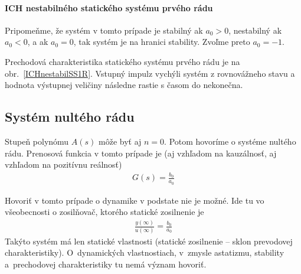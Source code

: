 \documentclass[a4paper, 10pt, ]{article}
\begin{document}
\paragraph{ICH nestabilného statického systému prvého rádu}

Pripomeňme, že  systém v tomto prípade je stabilný ak $a_0 > 0$, nestabilný ak $a_0 < 0$, a ak $a_0 = 0$, tak systém je na hranici stability. Zvoľme preto $a_0 = -1$.

Prechodová charakteristika statického systému prvého rádu je na obr.~\ref{ICHnestabilSS1R}. Vstupný impulz vychýli systém z rovnovážneho stavu a hodnota výstupnej veličiny následne rastie s časom do nekonečna.

\begin{center}


	\label{ICHnestabilSS1R}

\end{center}
















\subsection{Systém nultého rádu}

Stupeň polynómu $A(s)$ môže byť aj $n = 0$. Potom hovoríme o systéme nultého rádu. Prenosová funkcia v tomto prípade je (aj vzhľadom na kauzálnosť, aj vzhľadom na pozitívnu reálnosť)
\begin{align}
    G(s) = \frac{b_0}{a_0}
\end{align}

Hovoriť v tomto prípade o dynamike v podstate nie je možné. Ide tu vo všeobecnosti o zosilňovač, ktorého statické zosilnenie je
\begin{align}
    \frac{y(\infty)}{u(\infty)} = \frac{b_0 }{a_0}
\end{align}
Takýto systém má len statické vlastnosti (statické zosilnenie -- sklon prevodovej charakteristiky). O~dynamických vlastnostiach, v~zmysle astatizmu, stability a~prechodovej charakteristiky tu nemá význam hovoriť.
\end{document}

